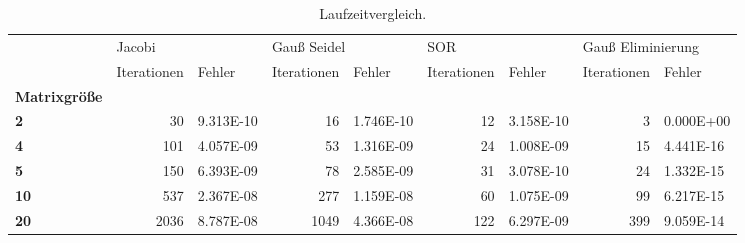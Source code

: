 \begin{table}[h!]
\centering
\caption{Laufzeitvergleich.}
\label{laufzeit}
\begin{tabular}{lrlrlrlrl}
\toprule
{} & \multicolumn{2}{l}{Jacobi} & \multicolumn{2}{l}{Gauß Seidel} & \multicolumn{2}{l}{SOR} & \multicolumn{2}{l}{Gauß Eliminierung} \\
{} & Iterationen &     Fehler & Iterationen &     Fehler & Iterationen &     Fehler &       Iterationen &     Fehler \\
\textbf{Matrixgröße} &             &            &             &            &             &            &                   &            \\
\midrule
\textbf{2          } &          30 &  9.313E-10 &          16 &  1.746E-10 &          12 &  3.158E-10 &                 3 &  0.000E+00 \\
\textbf{4          } &         101 &  4.057E-09 &          53 &  1.316E-09 &          24 &  1.008E-09 &                15 &  4.441E-16 \\
\textbf{5          } &         150 &  6.393E-09 &          78 &  2.585E-09 &          31 &  3.078E-10 &                24 &  1.332E-15 \\
\textbf{10         } &         537 &  2.367E-08 &         277 &  1.159E-08 &          60 &  1.075E-09 &                99 &  6.217E-15 \\
\textbf{20         } &        2036 &  8.787E-08 &        1049 &  4.366E-08 &         122 &  6.297E-09 &               399 &  9.059E-14 \\
\bottomrule
\end{tabular}
\end{table}

